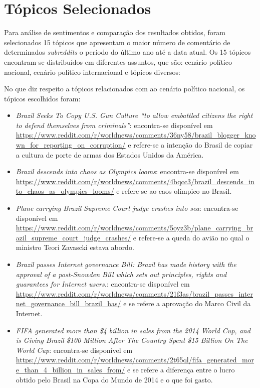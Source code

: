 \section{Tópicos Selecionados}

Para análise de sentimentos e comparação dos resultados obtidos, foram
selecionados 15 tópicos que apresentam o maior número de comentário de
determinados \textit{subreddits} o período do último ano até a data atual. Os 15
tópicos encontram-se distribuídos em diferentes assuntos, que são: cenário político nacional,
cenário político internacional e tópicos diversos:

No que diz respeito a tópicos relacionados com ao cenário político nacional, os
tópicos escolhidos foram:

\begin{itemize}
  \item
  \textit{Brazil Seeks To Copy U.S. Gun Culture ``to allow embattled
  citizens the right to defend themselves from
  criminals''}: encontra-se disponível em 
  \url{https://www.reddit.com/r/worldnews/comments/36ny58/brazil_blogger_known_for_reporting_on_corruption/}
  e refere-se a intenção do Brasil de copiar a cultura de porte de armas dos
  Estados Unidos da América.
  \item
  \textit{Brazil descends into chaos as Olympics looms}: encontra-se disponível em 
  \url{https://www.reddit.com/r/worldnews/comments/4bqcc3/brazil_descends_into_chaos_as_olympics_looms/}
  e refere-se ao caos olímpico no Brasil.
  \item
  \textit{Plane carrying Brazil Supreme Court judge crashes into sea}:
  encontra-se disponível em
  \url{https://www.reddit.com/r/worldnews/comments/5oyz3b/plane_carrying_brazil_supreme_court_judge_crashes/}
  e refere-se a queda do avião no qual o ministro Teori Zavascki estava abordo.
  \item
  \textit{Brazil passes Internet governance Bill: Brazil has made history with
  the approval of a post-Snowden Bill which sets out principles, rights and
  guarantees for Internet users.}: encontra-se disponível em
  \url{https://www.reddit.com/r/worldnews/comments/21f3as/brazil_passes_internet_governance_bill_brazil_has/}
  e se refere a aprovação do Marco Civil da Internet.
  \item
  \textit{FIFA generated more than \$4 billion in sales from the 2014 World Cup,
  and is Giving Brazil \$100 Million After The Country Spent \$15 Billion On The
  World Cup}: encontra-se disponível em
  \url{https://www.reddit.com/r/worldnews/comments/2t65ql/fifa_generated_more_than_4_billion_in_sales_from/}
  e se refere a diferença entre o lucro obtido pelo Brasil na Copa do Mundo de
  2014 e o que foi gasto.
 
\end{itemize}

